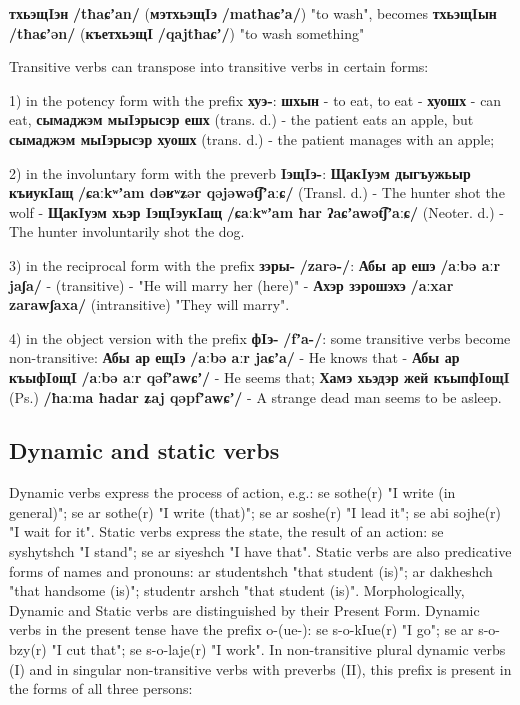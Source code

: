 \documentclass[a4paper,12pt]{book}
\newcommand{\1}[1]{\textbf{\emph{#1}}} %
\newcommand{\2}[1]{\textbf{[#1]}} %
\newcommand{\3}[1]{\fontsize{11pt}{0cm}\textbf{\emph{#1}}} %
\newcommand{\4}[1]{\fontsize{10pt}{0cm}\emph{#1}}	%
\newcommand{\5}[1]{\textbf{/#1/}} %
\newcommand{\6}[1]{\textbf{[#1]}} %
\newcommand{\7}[1]{\fontsize{12pt}{0cm}\emph{#1}} %
\newcommand{\8}[1]{\fontsize{12pt}{0cm}`#1'} %
\newcommand{\9}[1]{\fontsize{12pt}{0cm}(lit. `#1')} %
\newcommand{\glossphonemics}[1]{\textbf{/#1/}} %
\begin{document}
\begin{xlist}
\begin{xlist}
	\ex \textbf{тхьэщIэн} \glossphonemics{tħaɕʼan} (\textbf{мэтхьэщIэ} \glossphonemics{matħaɕʼa}) "to wash", becomes \textbf{тхьэщIын} \glossphonemics{tħaɕʼən} (\textbf{къетхьэщI} \glossphonemics{qajtħaɕʼ}) "to wash something"
	\end{xlist}
\end{xlist}

Transitive verbs can transpose into transitive verbs in certain forms:

1) in the potency form with the prefix \textbf{хуэ-}: \textbf{шхын} - to eat, to eat - \textbf{хуошх} - can eat, \textbf{сымаджэм мыIэрысэр ешх} (trans. d.) - the patient eats an apple, but \textbf{сымаджэм мыIэрысэр хуошх} (trans. d.) - the patient manages with an apple;

2) in the involuntary form with the preverb \textbf{IэщIэ-}: \textbf{ЩакIуэм дыгъужьыр къиукIащ} \glossphonemics{ɕaːkʷʼam dəʁʷʑər qəjəwət͡ʃʼaːɕ} (Transl. d.) - The hunter shot the wolf - \textbf{ЩакIуэм хьэр IэщIэукIащ} \glossphonemics{ɕaːkʷʼam ħar ʔaɕʼawət͡ʃʼaːɕ} (Neoter. d.) - The hunter involuntarily shot the dog.

3) in the reciprocal form with the prefix \textbf{зэры-} \glossphonemics{zarə-}: \textbf{Абы ар ешэ} \glossphonemics{aːbə aːr jaʃa} - (transitive) - "He will marry her (here)" - \textbf{Ахэр зэрошэхэ} \glossphonemics{aːxar zarawʃaxa} (intransitive) "They will marry".

4) in the object version with the prefix \textbf{фIэ-} \glossphonemics{fʼa-}: some transitive verbs become non-transitive: \textbf{Абы ар ещIэ} \glossphonemics{aːbə aːr jaɕʼa} - He knows that - \textbf{Абы ар къыфIощI} \glossphonemics{aːbə aːr qəfʼawɕʼ} - He seems that; \textbf{Хамэ хьэдэр жей къыпфIощI} (Ps.) \glossphonemics{ħaːma ħadar ʑaj qəpfʼawɕʼ} - A strange dead man seems to be asleep.

\subsection{Dynamic and static verbs}
Dynamic verbs express the process of action, e.g.: se sothe(r) "I write (in general)"; se ar sothe(r) "I write (that)"; se ar soshe(r) "I lead it"; se abi sojhe(r) "I wait for it".
Static verbs express the state, the result of an action: se syshytshch "I stand"; se ar siyeshch "I have that".
Static verbs are also predicative forms of names and pronouns: ar studentshch "that student (is)"; ar dakheshch "that handsome (is)"; studentr arshch "that student (is)".
Morphologically, Dynamic and Static verbs are distinguished by their Present Form. Dynamic verbs in the present tense have the prefix o-(ue-): se s-o-kIue(r) "I go"; se ar s-o-bzy(r) "I cut that"; se s-o-laje(r) "I work".
In non-transitive plural dynamic verbs (I) and in singular non-transitive verbs with preverbs (II), this prefix is present in the forms of all three persons:
\end{document}
